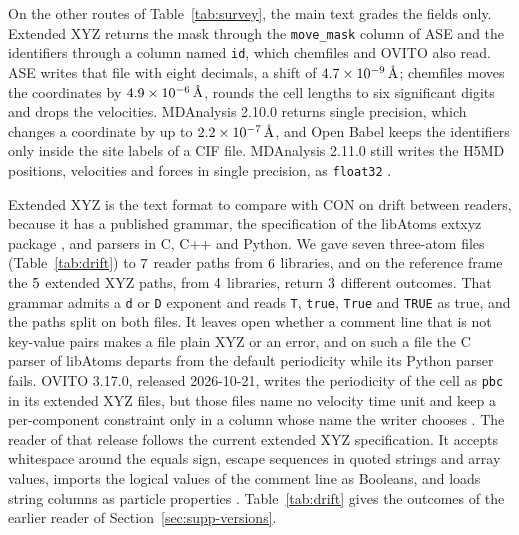\documentclass[preprint,12pt]{elsarticle}
\begin{document}
On the other routes of Table~\ref{tab:survey}, the main text grades the fields only.
Extended XYZ returns the mask through the \texttt{move\_mask} column of ASE and the identifiers through a column named \texttt{id}, which chemfiles and OVITO also read.
ASE writes that file with eight decimals, a shift of \(\num{4.7e-9}\,\text{\AA}\); chemfiles moves the coordinates by \(\num{4.9e-6}\,\text{\AA}\), rounds the cell lengths to six significant digits and drops the velocities.
MDAnalysis 2.10.0 returns single precision, which changes a coordinate by up to \(\num{2.2e-7}\,\text{\AA}\), and Open Babel keeps the identifiers only inside the site labels of a CIF file.
MDAnalysis 2.11.0 still writes the H5MD positions, velocities and forces in single precision, as \texttt{float32} \cite{gowersMdanalysismdanalysisRelease21102026,gowersMdanalysisH5mdPy21102026}.

Extended XYZ is the text format to compare with CON on drift between readers, because it has a published grammar, the specification of the libAtoms extxyz package \cite{kermodeLibatomsExtxyzV0462026}, and parsers in C, C++ and Python.
We gave seven three-atom files (Table~\ref{tab:drift}) to \(7\) reader paths from \(6\) libraries, and on the reference frame the \(5\) extended XYZ paths, from \(4\) libraries, return \(3\) different outcomes.
That grammar admits a \texttt{d} or \texttt{D} exponent and reads \texttt{T}, \texttt{true}, \texttt{True} and \texttt{TRUE} as true, and the paths split on both files.
It leaves open whether a comment line that is not key-value pairs makes a file plain XYZ or an error, and on such a file the C parser of libAtoms departs from the default periodicity while its Python parser fails.
OVITO 3.17.0, released 2026-10-21, writes the periodicity of the cell as \texttt{pbc} in its extended XYZ files, but those files name no velocity time unit and keep a per-component constraint only in a column whose name the writer chooses \cite{ovitoNewFeatures31702026}.
The reader of that release follows the current extended XYZ specification.
It accepts whitespace around the equals sign, escape sequences in quoted strings and array values, imports the logical values of the comment line as Booleans, and loads string columns as particle properties \cite{ovitoNewFeatures31702026}.
Table~\ref{tab:drift} gives the outcomes of the earlier reader of Section~\ref{sec:supp-versions}.
\end{document}
